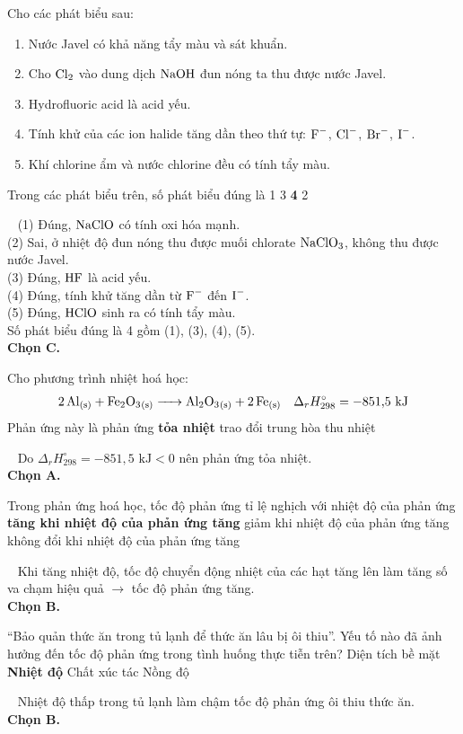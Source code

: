 \documentclass[12pt,a4paper]{article}
\renewcommand{\loigiai}[1]{%
  \par\smallskip\noindent{\color{blue!80!black}\textbf{Lời giải:}}\ #1\par\smallskip
}
\renewcommand{\True}{\bfseries\color{red!80!black}}
\begin{document}
\begin{ex}
Cho các phát biểu sau:
\begin{enumerate}[(1)]
	\item Nước Javel có khả năng tẩy màu và sát khuẩn.
	\item Cho $\ce{Cl2}$ vào dung dịch $\ce{NaOH}$ đun nóng ta thu được nước Javel.
	\item Hydrofluoric acid là acid yếu.
	\item Tính khử của các ion halide tăng dần theo thứ tự: $\ce{F-}$, $\ce{Cl-}$, $\ce{Br-}$, $\ce{I-}$.
	\item Khí chlorine ẩm và nước chlorine đều có tính tẩy màu.
\end{enumerate}
Trong các phát biểu trên, số phát biểu đúng là
\choice
{1}
{3}
{\True 4}
{2}
\loigiai{
(1) Đúng, $\ce{NaClO}$ có tính oxi hóa mạnh.\\
(2) Sai, ở nhiệt độ đun nóng thu được muối chlorate $\ce{NaClO3}$, không thu được nước Javel.\\
(3) Đúng, $\ce{HF}$ là acid yếu.\\
(4) Đúng, tính khử tăng dần từ $\ce{F-}$ đến $\ce{I-}$.\\
(5) Đúng, $\ce{HClO}$ sinh ra có tính tẩy màu.\\
Số phát biểu đúng là 4 gồm (1), (3), (4), (5).\\
\textbf{Chọn C.}
}
\end{ex}

\begin{ex}
Cho phương trình nhiệt hoá học:
\[\ce{2Al_{(s)} + Fe2O3_{(s)} -> Al2O3_{(s)} + 2Fe_{(s)}} \quad \Delta_r H^\circ_{298} = -851{,}5\text{ kJ}\]
Phản ứng này là phản ứng
\choice
{\True tỏa nhiệt}
{trao đổi}
{trung hòa}
{thu nhiệt}
\loigiai{
Do $\Delta_r H^\circ_{298} = -851{,}5\text{ kJ} < 0$ nên phản ứng tỏa nhiệt.\\
\textbf{Chọn A.}
}
\end{ex}

\begin{ex}
Trong phản ứng hoá học, tốc độ phản ứng
\choice
{tỉ lệ nghịch với nhiệt độ của phản ứng}
{\True tăng khi nhiệt độ của phản ứng tăng}
{giảm khi nhiệt độ của phản ứng tăng}
{không đổi khi nhiệt độ của phản ứng tăng}
\loigiai{
Khi tăng nhiệt độ, tốc độ chuyển động nhiệt của các hạt tăng lên làm tăng số va chạm hiệu quả $\rightarrow$ tốc độ phản ứng tăng.\\
\textbf{Chọn B.}
}
\end{ex}

\begin{ex}
“Bảo quản thức ăn trong tủ lạnh để thức ăn lâu bị ôi thiu”. Yếu tố nào đã ảnh hưởng đến tốc độ phản ứng trong tình huống thực tiễn trên?
\choice
{Diện tích bề mặt}
{\True Nhiệt độ}
{Chất xúc tác}
{Nồng độ}
\loigiai{
Nhiệt độ thấp trong tủ lạnh làm chậm tốc độ phản ứng ôi thiu thức ăn.\\
\textbf{Chọn B.}
}
\end{ex}
\end{document}
